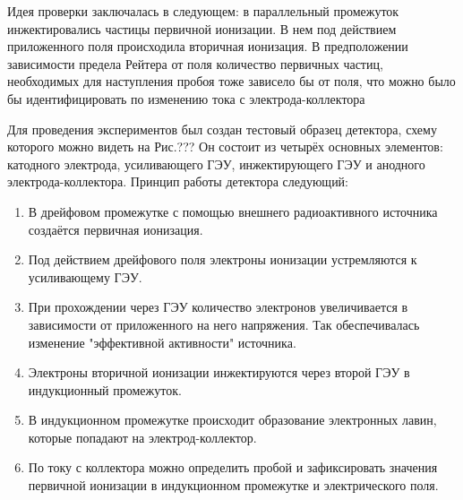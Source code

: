 \par Идея проверки заключалась в следующем: в параллельный промежуток инжектировались частицы первичной ионизации. В нем под действием приложенного поля происходила вторичная ионизация. В предположении зависимости предела Рейтера от поля количество первичных частиц, необходимых для наступления пробоя тоже зависело бы от поля, что можно было бы идентифицировать по изменению тока с электрода-коллектора 
\par Для проведения экспериментов был создан тестовый образец детектора, схему которого можно видеть на Рис.??? Он состоит из четырёх основных элементов: катодного электрода, усиливающего ГЭУ, инжектирующего ГЭУ и анодного электрода-коллектора. Принцип работы детектора следующий: 
\begin{enumerate}
	\item В дрейфовом промежутке с помощью внешнего радиоактивного источника создаётся первичная ионизация.
	\item Под действием дрейфового поля электроны ионизации устремляются к усиливающему ГЭУ.
	\item При прохождении через ГЭУ количество электронов увеличивается в зависимости от приложенного на него напряжения. Так обеспечивалась изменение "эффективной активности" источника.  
	\item Электроны вторичной ионизации инжектируются через второй ГЭУ в индукционный промежуток. 
	\item В индукционном промежутке происходит образование электронных лавин, которые попадают на электрод-коллектор. 
	\item По току с коллектора можно определить пробой и зафиксировать значения первичной ионизации в индукционном промежутке и электрического поля. 	
\end{enumerate}
